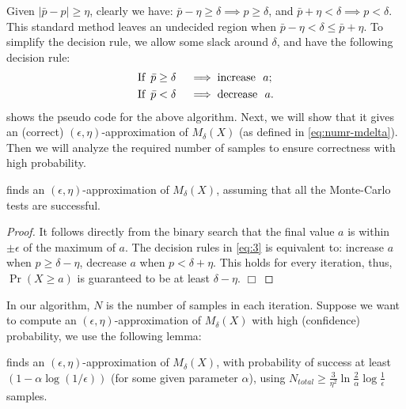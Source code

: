 Given $|\bar p - p| \geq \eta$, clearly we have: $\bar p - \eta \geq \delta \implies
p \geq \delta$, and $\bar p + \eta < \delta \implies p < \delta$. This standard method leaves
an undecided region when $\bar p - \eta < \delta \leq \bar p + \eta$. To simplify the decision
rule, we allow some slack around $\delta$, and have the following decision rule:
\begin{align}
\begin{aligned} \label{eq:3}
  & \text{If} \enskip \bar p  \geq \delta && \implies \text{increase} \,\,\,\, a; \\
  & \text{If} \enskip \bar p < \delta && \implies \text{decrease} \,\,\,\, a.
\end{aligned}
\end{align}
%
 shows the pseudo code for the above  algorithm. Next, we will show that it gives an (correct)
 $(\epsilon, \eta)$-approximation of  $M_{\delta}(X)$ (as defined in \ref{eq:numr-mdelta}). Then we will analyze the required number of samples to ensure correctness with high probability.
%
\begin{lemma}
\label{lem:ee-aprox}
 finds an  $(\epsilon, \eta)$-approximation of  $M_{\delta}(X)$, assuming that all the Monte-Carlo tests are successful.
\end{lemma}
\begin{proof}
It follows directly from the binary
search that the final value $a$ is within $\pm \epsilon$ of the maximum of $a$. The decision rules
in \cref{eq:3} is equivalent to: increase $a$ when $p \geq \delta - \eta$, decrease $a$ when
$p < \delta + \eta$. This holds for every iteration, thus, $\Pr(X \geq a)$ is guaranteed to be
at least $\delta - \eta$. $\Box$
\end{proof}
%
In our algorithm, $N$ is the number of samples in each iteration. Suppose we want to compute an
$(\epsilon, \eta)$-approximation of  $M_{\delta}(X)$ with  high (confidence) probability, we use the following lemma:
\begin{lemma}
\label{lem:num-samples}
 finds an $(\epsilon, \eta)$-approximation of $M_{\delta}(X)$, with probability of success  at least
$(1 - \alpha \log(1/\epsilon))$ (for some given parameter $\alpha$), using
$N_{\mathit{total}} \geq \frac{3}{\eta^2}\ln{\frac{2}{\alpha}} \log{\frac{1}{\epsilon}}$ samples.
\end{lemma}
